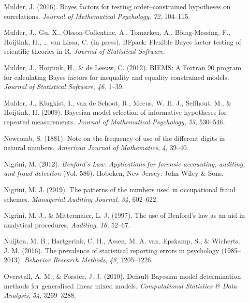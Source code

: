 \documentclass[
  english,
  man,floatsintext]{apa6}
\begin{document}
\leavevmode\hypertarget{ref-mulder2016bayes}{}%
Mulder, J. (2016). Bayes factors for testing order--constrained hypotheses on correlations. \emph{Journal of Mathematical Psychology}, \emph{72}, 104--115.

\leavevmode\hypertarget{ref-mulderBfpackInPress}{}%
Mulder, J., Gu, X., Olsson-Collentine, A., Tomarken, A., Böing-Messing, F., Hoijtink, H., \ldots{} van Lissa, C. (in press). BFpack: Flexible Bayes factor testing of scientific theories in R. \emph{Journal of Statistical Software}.

\leavevmode\hypertarget{ref-mulder2012biems}{}%
Mulder, J., Hoijtink, H., \& de Leeuw, C. (2012). BIEMS: A Fortran 90 program for calculating Bayes factors for inequality and equality constrained models. \emph{Journal of Statistical Software}, \emph{46}, 1--39.

\leavevmode\hypertarget{ref-mulder2009bayesian}{}%
Mulder, J., Klugkist, I., van de Schoot, R., Meeus, W. H. J., Selfhout, M., \& Hoijtink, H. (2009). Bayesian model selection of informative hypotheses for repeated measurements. \emph{Journal of Mathematical Psychology}, \emph{53}, 530--546.

\leavevmode\hypertarget{ref-newcomb1881note}{}%
Newcomb, S. (1881). Note on the frequency of use of the different digits in natural numbers. \emph{American Journal of Mathematics}, \emph{4}, 39--40.

\leavevmode\hypertarget{ref-nigrini2012benford}{}%
Nigrini, M. (2012). \emph{Benford's Law: Applications for forensic accounting, auditing, and fraud detection} (Vol. 586). Hoboken, New Jersey: John Wiley \& Sons.

\leavevmode\hypertarget{ref-nigrini2019patterns}{}%
Nigrini, M. J. (2019). The patterns of the numbers used in occupational fraud schemes. \emph{Managerial Auditing Journal}, \emph{34}, 602--622.

\leavevmode\hypertarget{ref-nigrini1997use}{}%
Nigrini, M. J., \& Mittermaier, L. J. (1997). The use of Benford's law as an aid in analytical procedures. \emph{Auditing}, \emph{16}, 52--67.

\leavevmode\hypertarget{ref-nuijten2016prevalence}{}%
Nuijten, M. B., Hartgerink, C. H., Assen, M. A. van, Epskamp, S., \& Wicherts, J. M. (2016). The prevalence of statistical reporting errors in psychology (1985--2013). \emph{Behavior Research Methods}, \emph{48}, 1205--1226.

\leavevmode\hypertarget{ref-overstall2010default}{}%
Overstall, A. M., \& Forster, J. J. (2010). Default Bayesian model determination methods for generalised linear mixed models. \emph{Computational Statistics \& Data Analysis}, \emph{54}, 3269--3288.
\end{document}
